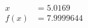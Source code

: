 \documentclass[preview]{standalone}
\begin{document}
\begin{align*}
x &= 5.0169\\f(x) &= 7.9999644
\end{align*}
\end{document}
